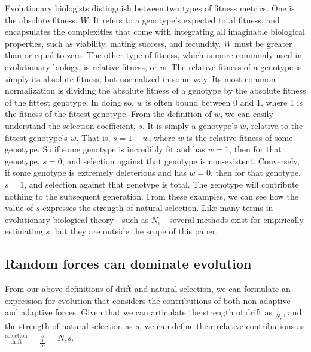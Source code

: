 \documentclass[twocolumn]{article}
\begin{document}
Evolutionary biologists distinguish between two types of fitness metrics\cite{orr_2009}. One is the absolute fitness, $W$. It refers to a genotype's expected total fitness, and encapsulates the complexities that come with integrating all imaginable biological properties, such as viability, mating success, and fecundity. $W$ must be greater than or equal to zero. The other type of fitness, which is more commonly used in evolutionary biology, is relative fitness, or $w$. The relative fitness of a genotype is simply its absolute fitness, but normalized in some way. Its most common normalization is dividing the absolute fitness of a genotype by the absolute fitness of the fittest genotype. In doing so, $w$ is often bound between 0 and 1, where 1 is the fitness of the fittest genotype. From the definition of $w$, we can easily understand the selection coefficient, $s$. It is simply a genotype's $w$, relative to the fittest genotype's $w$. That is, $s = 1 - w$, where $w$ is the relative fitness of some genotype. So if some genotype is incredibly fit and has $w=1$, then for that genotype, $s=0$, and selection against that genotype is non-existent. Conversely, if some genotype is extremely deleterious and has $w=0$, then for that genotype, $s=1$, and selection against that genotype is total. The genotype will contribute nothing to the subsequent generation. From these examples, we can see how the value of $s$ expresses the strength of natural selection. Like many terms in evolutionary biological theory---such as $N_e$---several methods exist for empirically estimating $s$\cite{orr_2009}, but they are outside the scope of this paper. 

\subsection{Random forces can dominate evolution} \label{Random forces can dominate evolution}
From our above definitions of drift and natural selection, we can formulate an expression for evolution that considers the contributions of both non-adaptive and adaptive forces. Given that we can articulate the strength of drift as $\frac{1}{N_e}$, and the strength of natural selection as $s$, we can define their relative contributions as $\frac{\text{selection}}{\text{drift}} = \frac{s}{\frac{1}{N_e}} = N_es$. 
\end{document}
